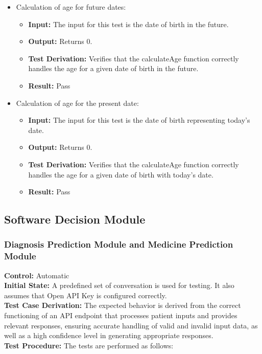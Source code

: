 \documentclass[12pt, titlepage]{article}
\begin{document}
\begin{itemize}
    \item Calculation of age for future dates:
      \begin{itemize}
        \item \textbf{Input:} The input for this test is the date of birth in the future.    
        \item \textbf{Output:} Returns 0.
        \item \textbf{Test Derivation:} Verifies that the calculateAge function correctly handles the age for a given date of birth in the future.
        \item \textbf{Result:} Pass
      \end{itemize}

    \item Calculation of age for the present date:
      \begin{itemize}
        \item \textbf{Input:} The input for this test is the date of birth representing today's date.    
        \item \textbf{Output:} Returns 0.
        \item \textbf{Test Derivation:} Verifies that the calculateAge function correctly handles the age for a given date of birth with today's date.
        \item \textbf{Result:} Pass
      \end{itemize}
  \end{itemize}

  \subsection{Software Decision Module}

  \subsubsection{Diagnosis Prediction Module and Medicine Prediction Module}

  \textbf{Control:} Automatic\\
  \textbf{Initial State:} A predefined set of conversation is used for testing. It also assumes that Open API Key is configured correctly.\\
  \textbf{Test Case Derivation:} The expected behavior is derived from the correct functioning of an API endpoint that processes patient inputs and provides relevant responses, ensuring accurate handling of valid and invalid input data, as well as a high confidence level in generating appropriate responses.\\
  \textbf{Test Procedure:} The tests are performed as follows:\\
\end{document}
